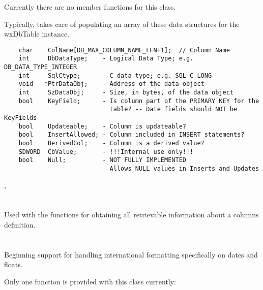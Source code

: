 Currently there are no member functions for this class.

Typically,  takes care of 
populating an array of these data structures for the wxDbTable instance.

\begin{verbatim}
    char    ColName[DB_MAX_COLUMN_NAME_LEN+1];  // Column Name
    int     DbDataType;    - Logical Data Type; e.g. DB_DATA_TYPE_INTEGER
    int     SqlCtype;      - C data type; e.g. SQL_C_LONG
    void   *PtrDataObj;    - Address of the data object
    int     SzDataObj;     - Size, in bytes, of the data object
    bool    KeyField;      - Is column part of the PRIMARY KEY for the
                             table? -- Date fields should NOT be KeyFields
    bool    Updateable;    - Column is updateable?
    bool    InsertAllowed; - Column included in INSERT statements?
    bool    DerivedCol;    - Column is a derived value?
    SDWORD  CbValue;       - !!!Internal use only!!!
    bool    Null;          - NOT FULLY IMPLEMENTED
                             Allows NULL values in Inserts and Updates
\end{verbatim}


, 


\section{}\label{wxdbcolinf}

Used with the  functions for obtaining all retrievable information about a columns definition.


\section{}\label{wxdbcolfor}

Beginning support for handling international formatting specifically on dates and floats.  

Only one function is provided with this class currently:

\label{wxdbcolforformat}

\label{wxdbcolforformat}

